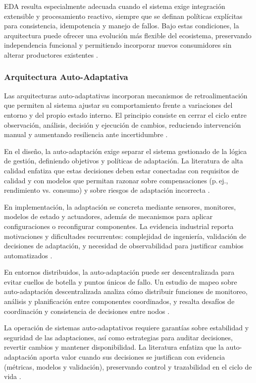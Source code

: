 			EDA resulta especialmente adecuada cuando el sistema exige integración extensible y procesamiento reactivo, siempre que se definan políticas explícitas para consistencia, idempotencia y manejo de fallos. Bajo estas condiciones, la arquitectura puede ofrecer una evolución más flexible del ecosistema, preservando independencia funcional y permitiendo incorporar nuevos consumidores sin alterar productores existentes \cite{Cabane2024Impact}.
			
			\subsubsection{Arquitectura Auto-Adaptativa}
			\noindent
			Las arquitecturas auto-adaptativas incorporan mecanismos de retroalimentación que permiten al sistema ajustar su comportamiento frente a variaciones del entorno y del propio estado interno. El principio consiste en cerrar el ciclo entre observación, análisis, decisión y ejecución de cambios, reduciendo intervención manual y aumentando resiliencia ante incertidumbre \cite{Ozkaya2020ASurvey}.
			
			En el diseño, la auto-adaptación exige separar el sistema gestionado de la lógica de gestión, definiendo objetivos y políticas de adaptación. La literatura de alta calidad enfatiza que estas decisiones deben estar conectadas con requisitos de calidad y con modelos que permitan razonar sobre compensaciones (p.\,ej., rendimiento vs. consumo) y sobre riesgos de adaptación incorrecta \cite{Ozkaya2020ASurvey}.
			
			En implementación, la adaptación se concreta mediante sensores, monitores, modelos de estado y actuadores, además de mecanismos para aplicar configuraciones o reconfigurar componentes. La evidencia industrial reporta motivaciones y dificultades recurrentes: complejidad de ingeniería, validación de decisiones de adaptación, y necesidad de observabilidad para justificar cambios automatizados \cite{Ozkaya2020ASurvey}.
			
			En entornos distribuidos, la auto-adaptación puede ser descentralizada para evitar cuellos de botella y puntos únicos de fallo. Un estudio de mapeo sobre auto-adaptación descentralizada analiza cómo distribuir funciones de monitoreo, análisis y planificación entre componentes coordinados, y resalta desafíos de coordinación y consistencia de decisiones entre nodos \cite{QuinEtAl2021Decentralized}.
			
			La operación de sistemas auto-adaptativos requiere garantías sobre estabilidad y seguridad de las adaptaciones, así como estrategias para auditar decisiones, revertir cambios y mantener disponibilidad. La literatura enfatiza que la auto-adaptación aporta valor cuando sus decisiones se justifican con evidencia (métricas, modelos y validación), preservando control y trazabilidad en el ciclo de vida \cite{Weyns2023CSUR,QuinEtAl2021Decentralized}.
			
